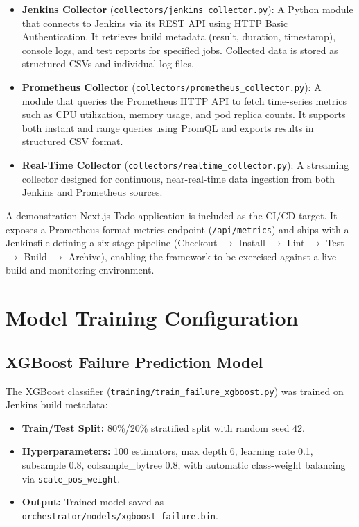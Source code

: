 \documentclass[a4paper,14pt,onecolumn]{report}
\begin{document}
\begin{itemize}
    \item \textbf{Jenkins Collector} (\texttt{collectors/jenkins\_collector.py}): A Python module that connects to Jenkins via its REST API using HTTP Basic Authentication. It retrieves build metadata (result, duration, timestamp), console logs, and test reports for specified jobs. Collected data is stored as structured CSVs and individual log files.

    \item \textbf{Prometheus Collector} (\texttt{collectors/prometheus\_collector.py}): A module that queries the Prometheus HTTP API to fetch time-series metrics such as CPU utilization, memory usage, and pod replica counts. It supports both instant and range queries using PromQL and exports results in structured CSV format.

    \item \textbf{Real-Time Collector} (\texttt{collectors/realtime\_collector.py}): A streaming collector designed for continuous, near-real-time data ingestion from both Jenkins and Prometheus sources.
\end{itemize}

A demonstration Next.js Todo application is included as the CI/CD target. It exposes a Prometheus-format metrics endpoint (\texttt{/api/metrics}) and ships with a Jenkinsfile defining a six-stage pipeline (Checkout $\rightarrow$ Install $\rightarrow$ Lint $\rightarrow$ Test $\rightarrow$ Build $\rightarrow$ Archive), enabling the framework to be exercised against a live build and monitoring environment.

\section{Model Training Configuration}

\subsection{XGBoost Failure Prediction Model}

The XGBoost classifier (\texttt{training/train\_failure\_xgboost.py}) was trained on Jenkins build metadata:

\begin{itemize}
    \item \textbf{Train/Test Split:} 80\%/20\% stratified split with random seed 42.
    \item \textbf{Hyperparameters:} 100 estimators, max depth 6, learning rate 0.1, subsample 0.8, colsample\_bytree 0.8, with automatic class-weight balancing via \texttt{scale\_pos\_weight}.
    \item \textbf{Output:} Trained model saved as \texttt{orchestrator/models/xgboost\_failure.bin}.
\end{itemize}
\end{document}
